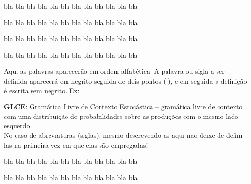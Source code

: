 \documentclass[12pt,a4paper,espaco=umemeio,noindentfirst,oneside,openany,tocpage=plain,pnumromarab,ruledheader,time,anapcustomindent]{abnt}
\begin{document}




\capa

\folhaderosto
\folhaderostoreverso

\folhadeaprovacao



bla bla bla bla bla bla bla bla bla bla bla bla

bla bla bla bla bla bla bla bla bla bla bla bla


bla bla bla bla bla bla bla bla bla bla bla bla

bla bla bla bla bla bla bla bla bla bla bla bla



Aqui as palavras aparecerão em ordem alfabética. A palavra ou sigla a ser definida aparecerá em negrito seguida de dois pontos (:), e em seguida a definição é escrita sem negrito. Ex:

{\bf GLCE}: Gramática Livre de Contexto Estocástica – gramática livre de contexto com uma distribuição de probabilidades sobre as produções com o mesmo lado esquerdo.\\

No caso de abreviaturas (siglas), mesmo descrevendo-as aqui não deixe de defini-las na primeira vez em que elas são empregadas!


\begin{resumo}

bla bla bla bla bla bla bla bla bla bla bla bla

bla bla bla bla bla bla bla bla bla bla bla bla

\makekeywords
\end{resumo}
\end{document}
